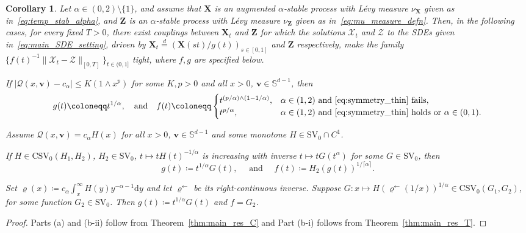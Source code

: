 \documentclass[en,oneside,bbfont,article]{amsart}
\newtheorem{corollary}[theorem]{Corollary}
\theoremstyle{remark}
\theoremstyle{definition}
\theoremstyle{definition}
\newcommand\calQ{\mathcal{Q}}
\newcommand\X{\bm{\mathcal{X}}}
\newcommand\ZZ{\bm{\mathcal{Z}}}
\newcommand\Sp{\mathbb{S}}
\newcommand\1{\mathds{1}}
\newcommand\SV{\mathrm{SV}}
\newcommand\CSV{\mathrm{CSV}}
\newcommand\la{\leftarrow}
\renewcommand\le{\leqslant}
\newcommand\eqd{\overset{d}{=}}
\newcommand\nf[1]{\normalfont{#1}}
\newcommand{\D}{\mathrm{d}}
\begin{document}
\begin{corollary}
\label{cor:augmented_stable_rates}
Let $\alpha \in (0,2)\setminus\{1\}$, and assume that $\bm{X}$ is an augmented $\alpha$-stable process with L\'evy measure $\nu_{\bm{X}}$ given as in~\eqref{eq:temp_stab_alpha}, and $\bm{Z}$ is an $\alpha$-stable process with L\'evy measure $\nu_{\bm{Z}}$ given as in~\eqref{eq:mu_measure_defn}. Then, in the following cases, for every fixed $T>0$, there exist couplings between $\bm{X}_t$ and $\bm{Z}$ for which the solutions $\X_t$ and $\ZZ$ to the SDEs given in~\eqref{eq:main_SDE_setting}, driven by $\bm{X}_t\eqd(\bm{X}(st)/g(t))_{s\in[0,1]}$ and $\bm{Z}$ respectively, make the family $\{f(t)^{-1}\|\X_t-\ZZ\|_{[0,T]}\}_{t\in(0,1]}$ tight, where $f,g$ are specified below.

\noindent{\nf{\textbf{(a) (DoNA)}}}
If $|\calQ(x,\bm{v})-c_\alpha| \le K(1\wedge x^p)$ for some $K,p>0$ and all $x>0$, $\bm{v}\in \Sp^{d-1}$, then
\[
g(t)\coloneqq t^{1/\alpha},
\quad\text{and}\quad
f(t)\coloneqq
\begin{cases}
t^{(p/\alpha)\wedge (1-1/\alpha) }, &\alpha\in(1,2)\text{ and \eqref{eq:symmetry_thin} fails}, \\
t^{p/\alpha}, &\alpha\in(1,2)\text{ and \eqref{eq:symmetry_thin} holds or $\alpha\in(0,1)$}.
\end{cases}
\]

\noindent{\nf{\textbf{(b) (DoNNA)}}} Assume $\calQ(x,\bm{v})\!=\! c_\alpha H(x)$ for all $x>0$, $\bm{v}\in \Sp^{d-1}$ and some monotone $H\in\SV_0\cap C^1$. 

\noindent{\nf{\textbf{(i)}}} If $H\in\CSV_0(H_1,H_2)$, $H_2\in\SV_0$, $t\mapsto tH(t)^{-1/\alpha}$ is increasing with inverse $t\mapsto tG(t^\alpha)$ for some $G\in\SV_0$, then 
\[
g(t)\coloneqq t^{1/\alpha}G(t), \quad \text{ and } \quad f(t)\coloneqq
H_2(g(t))^{1/\lceil\alpha\rceil}.
\]

\noindent{\nf{\textbf{(ii)}}} Set $\varrho(x)\coloneqq c_\alpha\int_x^\infty H(y) y^{-\alpha-1}\D y$ and let $\varrho^{\la}$ be its right-continuous inverse. Suppose $G:x\mapsto H(\varrho^{\la}(1/x))^{1/\alpha}\in \CSV_0(G_1,G_2)$, for some function $G_2\in\SV_0$. Then $g(t)\coloneqq t^{1/\alpha}G(t)$ and $f=G_2$.
\end{corollary}

\begin{proof}
Parts (a) and (b-ii) follow from Theorem~\ref{thm:main_res_C} and Part (b-i) follows from Theorem~\ref{thm:main_res_T}.
\end{proof}
\end{document}
